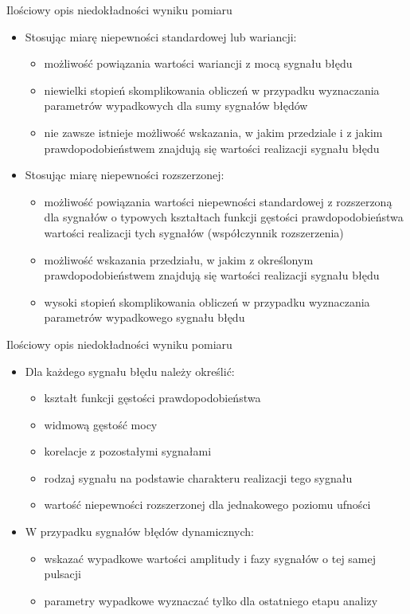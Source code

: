 \documentclass[12pt, polish, aspectratio = 169]{beamer}
\begin{document}
\begin{frame}{Ilościowy opis niedokładności wyniku pomiaru}
\begin{itemize}
\item Stosując miarę niepewności standardowej lub wariancji:
	\begin{itemize}
	\item możliwość powiązania wartości wariancji z mocą sygnału błędu
	\item niewielki stopień skomplikowania obliczeń w przypadku wyznaczania parametrów wypadkowych dla sumy sygnałów błędów
	\item nie zawsze istnieje możliwość wskazania, w jakim przedziale i z jakim prawdopodobieństwem znajdują się wartości realizacji sygnału błędu 
	\end{itemize}
\item Stosując miarę niepewności rozszerzonej:
	\begin{itemize}
	\item możliwość powiązania wartości niepewności standardowej z rozszerzoną dla sygnałów o typowych kształtach funkcji gęstości prawdopodobieństwa wartości realizacji tych sygnałów (współczynnik rozszerzenia)
	\item możliwość wskazania przedziału, w jakim z określonym prawdopodobieństwem znajdują się wartości realizacji sygnału błędu
	\item wysoki stopień skomplikowania obliczeń w przypadku wyznaczania parametrów wypadkowego sygnału błędu
	\end{itemize}
\end{itemize}
\end{frame}

\begin{frame}{Ilościowy opis niedokładności wyniku pomiaru}
\begin{itemize}
\item Dla każdego sygnału błędu należy określić:
	\begin{itemize}
	\item kształt funkcji gęstości prawdopodobieństwa
	\item widmową gęstość mocy
	\item korelacje z pozostałymi sygnałami
	\item rodzaj sygnału na podstawie charakteru realizacji tego sygnału
	\item wartość niepewności rozszerzonej dla jednakowego poziomu ufności
	\end{itemize}
\item W przypadku sygnałów błędów dynamicznych:
	\begin{itemize}
	\item wskazać wypadkowe wartości amplitudy i fazy sygnałów o tej samej pulsacji
	\item parametry wypadkowe wyznaczać tylko dla ostatniego etapu analizy
	\end{itemize}
\end{itemize}
\end{frame}
\end{document}
